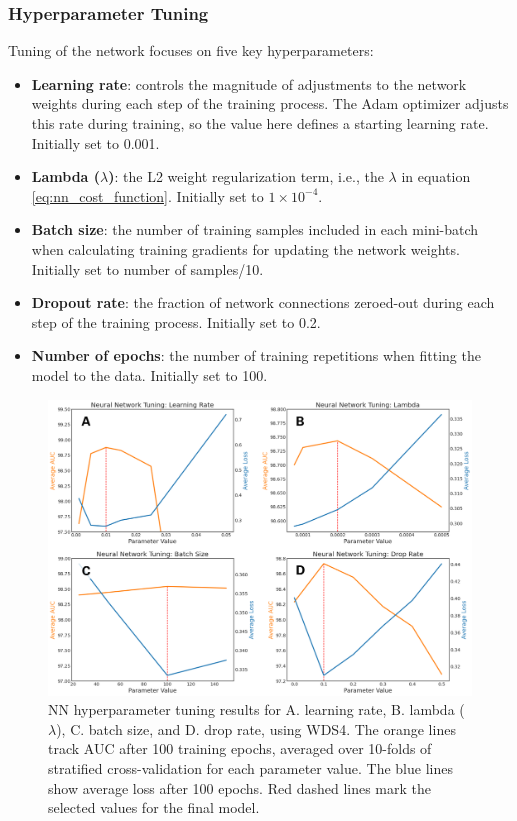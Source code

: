 \subsubsection{Hyperparameter Tuning}\label{ch5:ann_tuning}
Tuning of the network focuses on five key hyperparameters:
\begin{itemize}[itemsep=2pt]
    \item \textbf{Learning rate}: controls the magnitude of adjustments to the network weights during each step of the training process. The Adam optimizer adjusts this rate during training, so the value here defines a starting learning rate. Initially set to 0.001.
    \item \textbf{Lambda ($\lambda$)}: the L2 weight regularization term, i.e., the $\lambda$ in equation \ref{eq:nn_cost_function}. Initially set to $1\times10^{-4}$.
    \item \textbf{Batch size}: the number of training samples included in each mini-batch when calculating training gradients for updating the network weights. Initially set to number of samples/10.
    \item \textbf{Dropout rate}: the fraction of network connections zeroed-out during each step of the training process. Initially set to 0.2.
    \item \textbf{Number of epochs}: the number of training repetitions when fitting the model to the data. Initially set to 100.
\end{itemize}
\begin{figure}[htp]
\centering
\includegraphics[width=\textwidth]{templates/images/Figure-NN_Hyperparameters.png}
\caption[Neural network hyperparameter tuning]{NN hyperparameter tuning results for A. learning rate, B. lambda ($\lambda$), C. batch size, and D. drop rate, using WDS4. The orange lines track AUC after 100 training epochs, averaged over 10-folds of stratified cross-validation for each parameter value. The blue lines show average loss after 100 epochs. Red dashed lines mark the selected values for the final model.}
\label{fig:nn_tuning_plots}
\end{figure}


